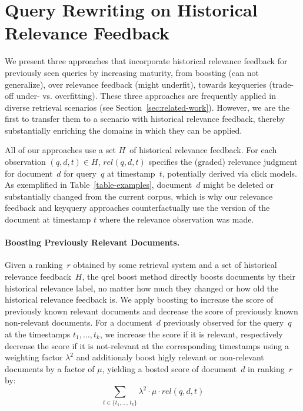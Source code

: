 \section{Query Rewriting on Historical Relevance Feedback}

We present three approaches that incorporate historical relevance feedback for previously seen queries by increasing maturity, from \Ni boosting (can not generalize), over \Nii relevance feedback (might underfit), towards \Niii keyqueries (trade-off under- vs. overfitting). These three approaches are frequently applied in diverse retrieval scenarios (see Section~\ref{sec:related-work}). However, we are the first to transfer them to a scenario with historical relevance feedback, thereby substantially enriching the domains in which they can be applied.

All of our approaches use a set $H$~of historical relevance feedback. For each observation $(q, d, t) \in H$, $rel(q, d, t)$ specifies the (graded) relevance judgment for document~$d$ for query~$q$ at timestamp~$t$, potentially derived via click models. As exemplified in Table~\ref{table-examples}, document~$d$ might be deleted or substantially changed from the current corpus, which is why our relevance feedback and keyquery approaches counterfactually use the version of the document at timestamp $t$ where the relevance observation was made.

\paragraph{Boosting Previously Relevant Documents.} Given a ranking~$r$ obtained by some retrieval system and a set of historical relevance feedback~$H$, the qrel boost method directly boosts documents by their historical relevance label, no matter how much they changed or how old the historical relevance feedback is. We apply boosting to increase the score of previously known relevant documents and decrease the score of previously known non-relevant documents. For a document~$d$ previously observed for the query~$q$ at the timestamps $t_{1}, \ldots, t_{k}$, we increase the score if it is relevant, respectively decrease the score if it is not-relevant at the corresponding timestamps using a weighting factor $\lambda^2$ and additionaly boost higly relevant or non-relevant documents by a factor of $\mu$, yielding a bosted score of document~$d$ in ranking~$r$ by:
\begin{equation}
\sum\limits_{t \in \{t_{1}, \ldots, t_{k}\}} \lambda^2 \cdot \mu \cdot rel(q,d,t)
\end{equation}

